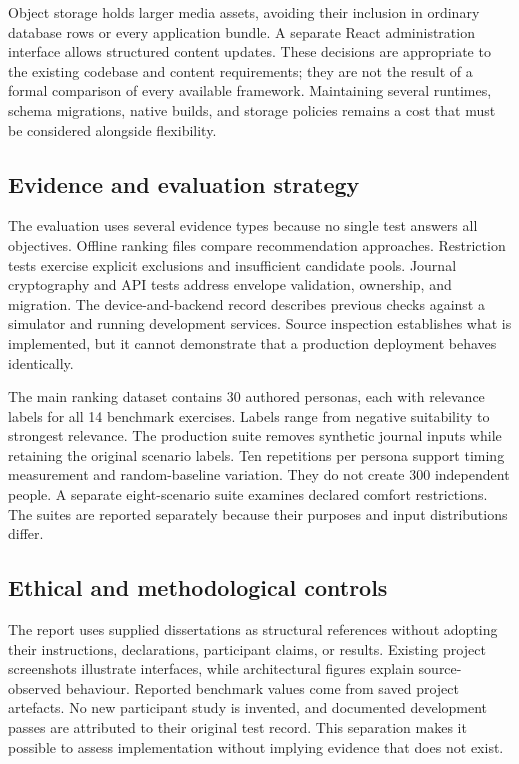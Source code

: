 Object storage holds larger media assets, avoiding their inclusion in ordinary database rows or every application bundle. A separate React administration interface allows structured content updates. These decisions are appropriate to the existing codebase and content requirements; they are not the result of a formal comparison of every available framework. Maintaining several runtimes, schema migrations, native builds, and storage policies remains a cost that must be considered alongside flexibility.

\subsection{Evidence and evaluation strategy}

The evaluation uses several evidence types because no single test answers all objectives. Offline ranking files compare recommendation approaches. Restriction tests exercise explicit exclusions and insufficient candidate pools. Journal cryptography and API tests address envelope validation, ownership, and migration. The device-and-backend record describes previous checks against a simulator and running development services. Source inspection establishes what is implemented, but it cannot demonstrate that a production deployment behaves identically.

The main ranking dataset contains 30 authored personas, each with relevance labels for all 14 benchmark exercises. Labels range from negative suitability to strongest relevance. The production suite removes synthetic journal inputs while retaining the original scenario labels. Ten repetitions per persona support timing measurement and random-baseline variation. They do not create 300 independent people. A separate eight-scenario suite examines declared comfort restrictions. The suites are reported separately because their purposes and input distributions differ.

\subsection{Ethical and methodological controls}

The report uses supplied dissertations as structural references without adopting their instructions, declarations, participant claims, or results. Existing project screenshots illustrate interfaces, while architectural figures explain source-observed behaviour. Reported benchmark values come from saved project artefacts. No new participant study is invented, and documented development passes are attributed to their original test record. This separation makes it possible to assess implementation without implying evidence that does not exist.

